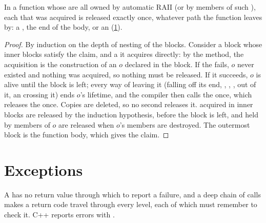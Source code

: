 \begin{proposition}\label{prop:b2:cpp-classes-raii:every-path}
In a function whose  are all owned by automatic RAII  (or by members of such ), each 
that was acquired is released exactly once, whatever path the function leaves by: a , the end of the
body, or an  (\cref{sec:b2:cpp-classes-raii:exceptions}).
\end{proposition}

\begin{proof}
By induction on the depth of nesting of the blocks. Consider a block whose inner blocks satisfy the claim, and a
 it acquires directly: by the method, the acquisition is the construction of an  $o$ declared in the
block. If the  fails, $o$ never existed and nothing was acquired, so nothing must be released. If it
succeeds, $o$ is alive until the block is left; every way of leaving it (falling off its end, ,
, ,  out of it, an  crossing it) ends $o$'s lifetime, and the compiler
then calls the  once, which releases the  once. Copies are deleted, so no second  releases
it.  acquired in inner blocks are released by the induction hypothesis, before the block is left, and
 held by members of $o$ are released when $o$'s members are destroyed. The outermost block is the
function body, which gives the claim.
\end{proof}

\section{Exceptions}\label{sec:b2:cpp-classes-raii:exceptions}

A  has no return value through which to report a failure, and a deep chain of calls makes a return code
travel through every level, each of which must remember to check it. C++ reports errors with .


